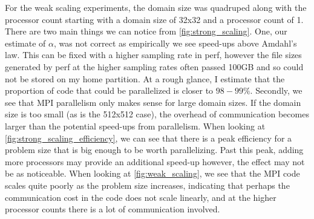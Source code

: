 \FloatBarrier
For the weak scaling experiments, the domain size was quadruped along with the processor count starting with a domain
size of 32x32 and a processor count of 1. There are two main things we can notice from \autoref{fig:strong_scaling}. One, our estimate of $\alpha$, was not
correct as empirically we see speed-ups above Amdahl's law. This can be fixed with a higher sampling rate in perf,
however the file sizes generated by perf at the higher sampling rates often passed 100GB and so could not be stored on
my home partition. At a rough glance, I estimate that the proportion of code that could be parallelized is closer to
$98-99\%$. Secondly, we see that MPI parallelism only makes sense for large domain sizes. If the domain size is too
small (as is the 512x512 case), the overhead of communication becomes larger than the potential speed-ups from
parallelism. When looking at \autoref{fig:strong_scaling_efficiency}, we can see that there is a peak efficiency for a
problem size that is big enough to be worth parallelizing. Past this peak, adding more processors may provide an
additional speed-up however, the effect may not be as noticeable. When looking at \autoref{fig:weak_scaling}, we see
that the MPI code scales quite poorly as the problem size increases, indicating that perhaps the communication cost in
the code does not scale linearly, and at the higher processor counts there is a lot of communication involved.


